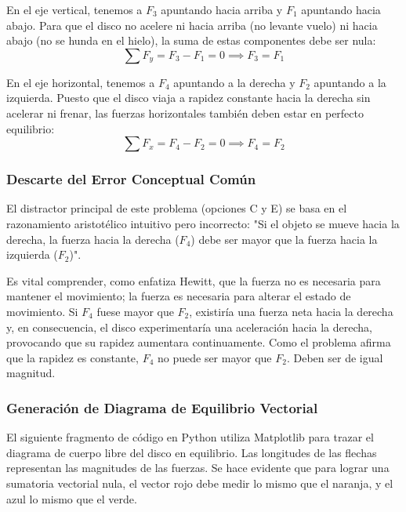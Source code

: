 \documentclass[12pt, a4paper]{article}
\begin{document}
En el eje vertical, tenemos a $F_3$ apuntando hacia arriba y $F_1$ apuntando hacia abajo. Para que el disco no acelere ni hacia arriba (no levante vuelo) ni hacia abajo (no se hunda en el hielo), la suma de estas componentes debe ser nula:
\begin{equation}
\sum F_y = F_3 - F_1 = 0 \implies F_3 = F_1
\end{equation}

En el eje horizontal, tenemos a $F_4$ apuntando a la derecha y $F_2$ apuntando a la izquierda. Puesto que el disco viaja a rapidez constante hacia la derecha sin acelerar ni frenar, las fuerzas horizontales también deben estar en perfecto equilibrio:
\begin{equation}
\sum F_x = F_4 - F_2 = 0 \implies F_4 = F_2
\end{equation}

\subsubsection*{Descarte del Error Conceptual Común}

El distractor principal de este problema (opciones C y E) se basa en el razonamiento aristotélico intuitivo pero incorrecto: "Si el objeto se mueve hacia la derecha, la fuerza hacia la derecha ($F_4$) debe ser mayor que la fuerza hacia la izquierda ($F_2$)". 

Es vital comprender, como enfatiza Hewitt, que la fuerza no es necesaria para mantener el movimiento; la fuerza es necesaria para alterar el estado de movimiento. Si $F_4$ fuese mayor que $F_2$, existiría una fuerza neta hacia la derecha y, en consecuencia, el disco experimentaría una aceleración hacia la derecha, provocando que su rapidez aumentara continuamente. Como el problema afirma que la rapidez es constante, $F_4$ no puede ser mayor que $F_2$. Deben ser de igual magnitud.

\subsubsection*{Generación de Diagrama de Equilibrio Vectorial}

El siguiente fragmento de código en Python utiliza Matplotlib para trazar el diagrama de cuerpo libre del disco en equilibrio. Las longitudes de las flechas representan las magnitudes de las fuerzas. Se hace evidente que para lograr una sumatoria vectorial nula, el vector rojo debe medir lo mismo que el naranja, y el azul lo mismo que el verde.
\end{document}
